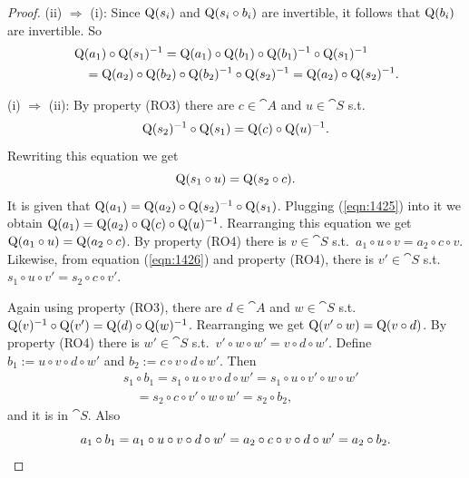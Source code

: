 \begin{proof} \mbox{}

\smallskip \noindent
(ii) $\Rightarrow$ (i):
Since $\operatorname{Q}(s_i)$ and $\operatorname{Q}(s_i \circ b_i)$ are invertible, it 
follows that 
$\operatorname{Q}(b_i)$ are invertible. So 
\[ \begin{aligned}
& \operatorname{Q}(a_1) \circ \operatorname{Q}(s_1)^{-1} = \operatorname{Q}(a_1) \circ 
\operatorname{Q}(b_1) \circ \operatorname{Q}(b_1)^{-1} \circ \operatorname{Q}(s_1)^{-1} 
\\
& \quad = 
\operatorname{Q}(a_2) \circ \operatorname{Q}(b_2) \circ \operatorname{Q}(b_2)^{-1} \circ 
\operatorname{Q}(s_2)^{-1} =  \operatorname{Q}(a_2) \circ \operatorname{Q}(s_2)^{-1} .
\end{aligned} \]

\medskip \noindent
(i) $\Rightarrow$ (ii):
By property (RO3) there are $c \in \cat{A}$ and $u \in \cat{S}$ s.t.\
\begin{equation} \label{eqn:1425}
\operatorname{Q}(s_2)^{-1} \circ \operatorname{Q}(s_1) = \operatorname{Q}(c) \circ \operatorname{Q}(u)^{-1} . 
\end{equation}
Rewriting this equation we get 
\begin{equation} \label{eqn:1426}
\operatorname{Q}(s_1 \circ u) = \operatorname{Q}(s_2 \circ c) . 
\end{equation}
It is given that 
$\operatorname{Q}(a_1) =  \operatorname{Q}(a_2) \circ \operatorname{Q}(s_2)^{-1} \circ \operatorname{Q}(s_1)$.
Plugging (\ref{eqn:1425}) into it we obtain 
$\operatorname{Q}(a_1) =  \operatorname{Q}(a_2) \circ \operatorname{Q}(c) \circ \operatorname{Q}(u)^{-1}$.
Rearranging this equation we get 
$\operatorname{Q}(a_1 \circ u) = \operatorname{Q}(a_2 \circ c)$. 
By property (RO4) there is 
$v \in \cat{S}$ s.t.\ 
$a _1 \circ u \circ v = a_2 \circ c \circ v$.
Likewise, from equation (\ref{eqn:1426}) and property (RO4), there is 
$v' \in \cat{S}$ s.t.\ 
$s_1 \circ u \circ v' = s_2 \circ c \circ v'$. 

Again using property (RO3), there are $d \in \cat{A}$ and $w \in \cat{S}$ s.t.\
$\operatorname{Q}(v)^{-1} \circ \operatorname{Q}(v') = \operatorname{Q}(d) \circ \operatorname{Q}(w)^{-1}$.
Rearranging we get 
$\operatorname{Q}(v' \circ w) = \operatorname{Q}(v \circ d)$.
By property (RO4) there is $w' \in \cat{S}$ s.t.\ 
$v' \circ w \circ w' = v \circ d \circ w'$.
Define 
$b_1 := u \circ v \circ  d \circ w'$ 
and
$b_2 := c \circ v \circ d \circ w'$.
Then 
\[ \begin{aligned}
& s_1 \circ b_1 = s_1 \circ u \circ v \circ  d \circ w' = 
s_1 \circ u \circ v' \circ w \circ w' 
\\
& \quad = s_2 \circ c \circ v' \circ w \circ w' = s_2 \circ b_2 , 
\end{aligned} \]
and it is in $\cat{S}$. 
Also 
\[ a_1 \circ b_1 = a_1 \circ u \circ v \circ  d \circ w' =
a_2 \circ c \circ v  \circ  d \circ w' = a_2 \circ b_2 . \qedhere \]
\end{proof}


